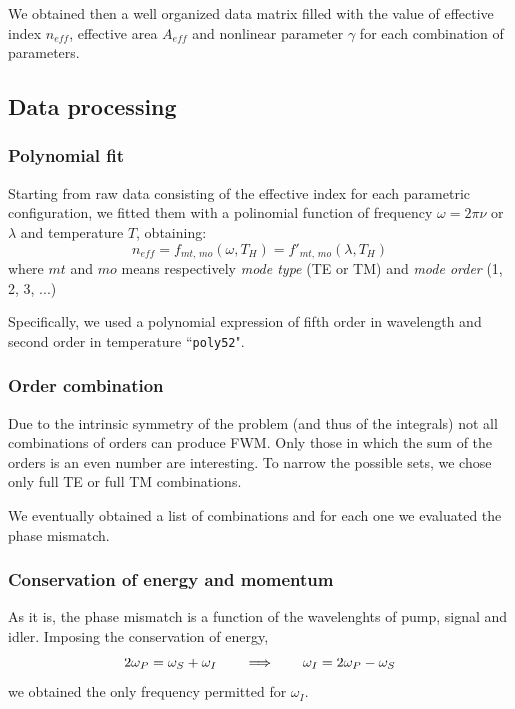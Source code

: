 \documentclass[12pt,a4paper,twoside]{article}
\begin{document}
We obtained then a well organized data matrix filled with the value of effective index $n_{eff}$, effective area $A_{eff}$ and nonlinear parameter $\gamma$ for each combination of parameters.

\subsection{Data processing}

\subsubsection{Polynomial fit}
Starting from raw data consisting of the effective index for each parametric configuration, we fitted them with a polinomial function of frequency $\omega = 2\pi \nu$ or $\lambda$ and temperature $T$, obtaining:
$$n_{eff} = f_{mt,\,mo} \left( \omega, T_H \right) = f'_{mt,\,mo} \left( \lambda, T_H \right)$$
where $mt$ and $mo$ means respectively \textit{mode type} (TE or TM) and \textit{mode order} (1, 2, 3, ...)

Specifically, we used a polynomial expression of fifth order in wavelength and second order in temperature ``\texttt{poly52}".

\subsubsection{Order combination}

Due to the intrinsic symmetry of the problem (and thus of the integrals) not all combinations of orders can produce FWM.
Only those in which the sum of the orders is an even number are interesting.
To narrow the possible sets, we chose only full TE or full TM  combinations.

We eventually obtained a list of combinations and for each one we evaluated the phase mismatch.

\subsubsection{Conservation of energy and momentum}
As it is, the phase mismatch is a function of the wavelenghts of pump, signal and idler.
Imposing the conservation of energy,
\begin{equation}
2\omega_P = \omega_S + \omega_I
\qquad \Longrightarrow \qquad
\omega_I = 2\omega_P - \omega_S \\
\end{equation}
we obtained the only frequency permitted for $\omega_I$.
\end{document}
